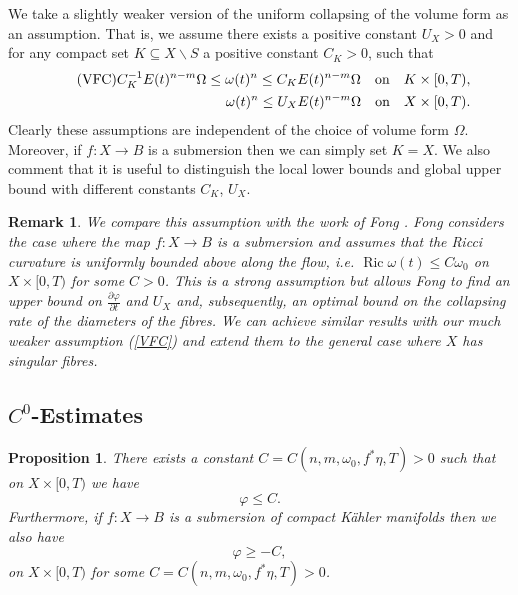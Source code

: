 \documentclass[12pt]{article}
\newtheorem{proposition}[theorem]{Proposition}
\newtheorem{remark}[theorem]{Remark}
\numberwithin{equation}{section}
\renewcommand{\d}{\partial}
\DeclareMathOperator{\Ric}{Ric}
\begin{document}
\noindent We take a slightly weaker version of the uniform collapsing of the volume form as an assumption. That is, we assume there exists a positive constant $U_X > 0$ and for any compact set $K \subseteq X \backslash S$ a positive constant $C_K > 0$, such that
\begin{align}\tag{VFC}\label{VFC}
    C_K^{-1}E(t)^{n-m}\Omega \leq \omega(t)^{n} \leq C_KE(t)^{n-m}\Omega \quad \text{on} \quad K \times [0,T),\\
    \omega(t)^n \leq U_XE(t)^{n-m} \Omega \quad \text{on} \quad X \times [0,T).\notag
\end{align}
Clearly these assumptions are independent of the choice of volume form $\Omega$. Moreover, if $f: X \to B$ is a submersion then we can simply set $K = X$. We also comment that it is useful to distinguish the local lower bounds and global upper bound with different constants $C_K$, $U_X$.

\begin{remark}
We compare this assumption with the work of Fong \cite{F15}. Fong considers the case where the map $f: X \to B$ is a submersion and assumes that the Ricci curvature is uniformly bounded above along the flow, i.e. $\Ric \omega(t) \leq C \omega_0$ on $X \times [0,T)$ for some $C > 0$. This is a strong assumption but allows Fong to find an upper bound on $\frac{\d \varphi}{\d t}$ and $U_X$ and, subsequently, an optimal bound on the collapsing rate of the diameters of the fibres. We can achieve similar results with our much weaker assumption (\ref{VFC}) and extend them to the general case where $X$ has singular fibres.
\end{remark}

\subsection{$C^0$-Estimates}

\begin{proposition}\label{submersion_C0_varphi_estimate}
There exists a constant $C = C(n,m,\omega_0,f^*\eta,T) > 0$ such that on $X \times [0,T)$ we have
\begin{equation*}
    \varphi \leq C.
\end{equation*}
Furthermore, if $f: X \to B$ is a submersion of compact K\"ahler manifolds then we also have
\begin{equation*}
    \varphi \geq -C,
\end{equation*}
on $X \times [0,T)$ for some $C = C(n,m,\omega_0,f^*\eta, T) > 0$.
\end{proposition}
\end{document}
